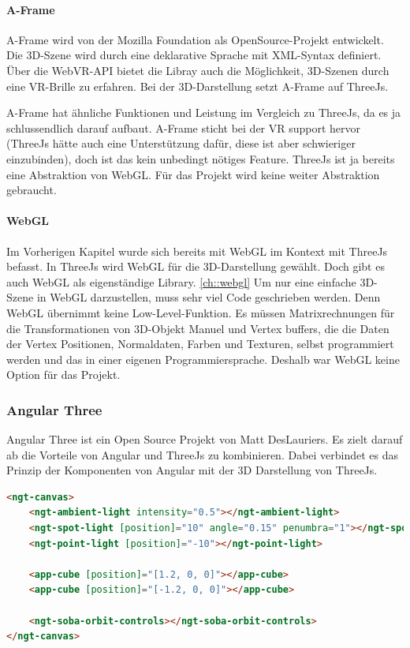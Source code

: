 \paragraph{A-Frame}
A-Frame wird von der Mozilla Foundation als OpenSource-Projekt entwickelt. Die 3D-Szene wird durch eine deklarative Sprache mit XML-Syntax definiert. Über die WebVR-API bietet die Libray auch die Möglichkeit, 3D-Szenen durch eine VR-Brille zu erfahren. Bei der 3D-Darstellung setzt A-Frame auf ThreeJs. \cite[A-Frame Wikipedia]{a-frame-wiki}

A-Frame hat ähnliche Funktionen und Leistung im Vergleich zu ThreeJs, da es ja schlussendlich darauf aufbaut. A-Frame sticht bei der VR support hervor (ThreeJs hätte auch eine Unterstützung dafür, diese ist aber schwieriger einzubinden), doch ist das kein unbedingt nötiges Feature. ThreeJs ist ja bereits eine Abstraktion von WebGL. Für das Projekt wird keine weiter Abstraktion gebraucht.

\paragraph{WebGL}
Im Vorherigen Kapitel wurde sich bereits mit WebGL im Kontext mit ThreeJs befasst. In ThreeJs wird WebGL für die 3D-Darstellung gewählt. Doch gibt es auch WebGL als eigenständige Library. \ref{ch::webgl}
Um nur eine einfache 3D-Szene in WebGL darzustellen, muss sehr viel Code geschrieben werden. Denn WebGL übernimmt keine Low-Level-Funktion. Es müssen Matrixrechnungen für die Transformationen von 3D-Objekt Manuel und Vertex buffers, die die Daten der Vertex Positionen, Normaldaten, Farben und Texturen, selbst programmiert werden und das in einer eigenen Programmiersprache. Deshalb war WebGL keine Option für das Projekt.

\subsubsection{Angular Three}
\label{ch:Technologien:AngularThree}
Angular Three ist ein Open Source Projekt von Matt DesLauriers. Es zielt darauf ab die Vorteile von Angular und ThreeJs zu kombinieren. Dabei verbindet es das Prinzip der Komponenten von Angular mit der 3D Darstellung von ThreeJs. 

\begin{lstlisting}[language=html,caption=Angular Three - Komponentenbasiertes 3D Scenen in HTML,label=lst:impl:AngularThreeExampleCode]
<ngt-canvas>
    <ngt-ambient-light intensity="0.5"></ngt-ambient-light>
    <ngt-spot-light [position]="10" angle="0.15" penumbra="1"></ngt-spot-light>
    <ngt-point-light [position]="-10"></ngt-point-light>
  
    <app-cube [position]="[1.2, 0, 0]"></app-cube>
    <app-cube [position]="[-1.2, 0, 0]"></app-cube>
  
    <ngt-soba-orbit-controls></ngt-soba-orbit-controls>
</ngt-canvas>
\end{lstlisting}

